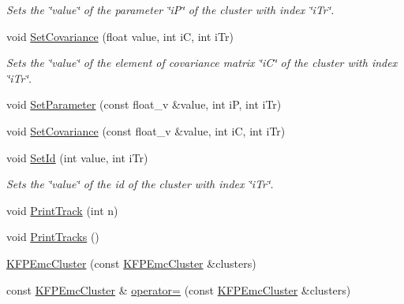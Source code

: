 \begin{DoxyCompactItemize}
\begin{DoxyCompactList}\small\item\em Sets the \char`\"{}value\char`\"{} of the parameter \char`\"{}i\+P\char`\"{} of the cluster with index \char`\"{}i\+Tr\char`\"{}. \end{DoxyCompactList}\item 
void \hyperlink{classKFPEmcCluster_acc64537b2d9ab1300025861ee0148b52}{Set\+Covariance} (float value, int iC, int i\+Tr)\hypertarget{classKFPEmcCluster_acc64537b2d9ab1300025861ee0148b52}{}\label{classKFPEmcCluster_acc64537b2d9ab1300025861ee0148b52}

\begin{DoxyCompactList}\small\item\em Sets the \char`\"{}value\char`\"{} of the element of covariance matrix \char`\"{}i\+C\char`\"{} of the cluster with index \char`\"{}i\+Tr\char`\"{}. \end{DoxyCompactList}\item 
void \hyperlink{classKFPEmcCluster_acd797b0c7415f51cfa0f6f9ccf7f4dde}{Set\+Parameter} (const float\+\_\+v \&value, int iP, int i\+Tr)
\item 
void \hyperlink{classKFPEmcCluster_a5981994b54f8b0db7c8a08795569046b}{Set\+Covariance} (const float\+\_\+v \&value, int iC, int i\+Tr)
\item 
void \hyperlink{classKFPEmcCluster_a416634c336c40aaa27789e949cc60c89}{Set\+Id} (int value, int i\+Tr)\hypertarget{classKFPEmcCluster_a416634c336c40aaa27789e949cc60c89}{}\label{classKFPEmcCluster_a416634c336c40aaa27789e949cc60c89}

\begin{DoxyCompactList}\small\item\em Sets the \char`\"{}value\char`\"{} of the id of the cluster with index \char`\"{}i\+Tr\char`\"{}. \end{DoxyCompactList}\item 
void \hyperlink{classKFPEmcCluster_aeb95144438a4c90c67078deb23295cb8}{Print\+Track} (int n)
\item 
void \hyperlink{classKFPEmcCluster_a1dad0ca2ab0a842910d277b6c0866299}{Print\+Tracks} ()
\item 
\hyperlink{classKFPEmcCluster_abd234dbbe0dc96f5fec4c2a9c1967b4c}{K\+F\+P\+Emc\+Cluster} (const \hyperlink{classKFPEmcCluster}{K\+F\+P\+Emc\+Cluster} \&clusters)
\item 
const \hyperlink{classKFPEmcCluster}{K\+F\+P\+Emc\+Cluster} \& \hyperlink{classKFPEmcCluster_a747c671d0c63cbf5f864956e7064b59a}{operator=} (const \hyperlink{classKFPEmcCluster}{K\+F\+P\+Emc\+Cluster} \&clusters)
\end{DoxyCompactItemize}


